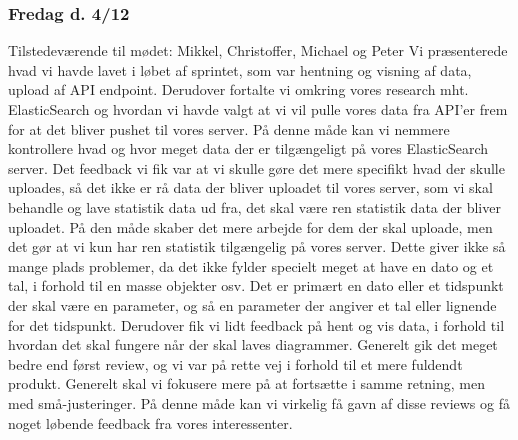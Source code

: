 \subsubsection{Fredag d. 4/12}
Tilstedeværende til mødet: Mikkel, Christoffer, Michael og Peter
Vi præsenterede hvad vi havde lavet i løbet af sprintet, som var hentning og visning af data, upload af API endpoint. Derudover fortalte vi omkring vores research mht. ElasticSearch og hvordan vi havde valgt at vi vil pulle vores data fra API'er frem for at det bliver pushet til vores server. På denne måde kan vi nemmere kontrollere hvad og hvor meget data der er tilgængeligt på vores ElasticSearch server.
Det feedback vi fik var at vi skulle gøre det mere specifikt hvad der skulle uploades, så det ikke er rå data der bliver uploadet til vores server, som vi skal behandle og lave statistik data ud fra, det skal være ren statistik data der bliver uploadet. På den måde skaber det mere arbejde for dem der skal uploade, men det gør at vi kun har ren statistik tilgængelig på vores server. Dette giver ikke så mange plads problemer, da det ikke fylder specielt meget at have en dato og et tal, i forhold til en masse objekter osv. Det er primært en dato eller et tidspunkt der skal være en parameter, og så en parameter der angiver et tal eller lignende for det tidspunkt.
Derudover fik vi lidt feedback på hent og vis data, i forhold til hvordan det skal fungere når der skal laves diagrammer.
Generelt gik det meget bedre end først review, og vi var på rette vej i forhold til et mere fuldendt produkt. Generelt skal vi fokusere mere på at fortsætte i samme retning, men med små-justeringer. På denne måde kan vi virkelig få gavn af disse reviews og få noget løbende feedback fra vores interessenter.
